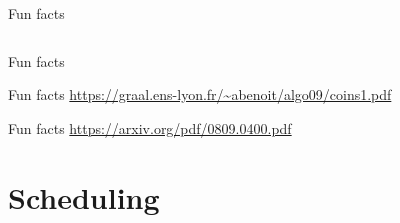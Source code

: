 \begin{OnlySlides}{Fun facts}

\vspace{-18pt}
\begin{columns}[T]
\vspace{-3pt}
\begin{center}
\vspace{-3pt}
\end{center}
\end{columns}    
\smallskip
{}
\begin{center}
\end{center}

\end{OnlySlides}

\begin{OnlySlides}{Fun facts}
\vspace{-12pt}
\end{OnlySlides}

\begin{OnlySlides}{Fun facts}
\vspace{-12pt}
\tiny 
\url{https://graal.ens-lyon.fr/~abenoit/algo09/coins1.pdf}
\end{OnlySlides}


\begin{OnlySlides}{Fun facts}
\vspace{-12pt}
\tiny
\url{https://arxiv.org/pdf/0809.0400.pdf}
\end{OnlySlides}


\section{Scheduling}

